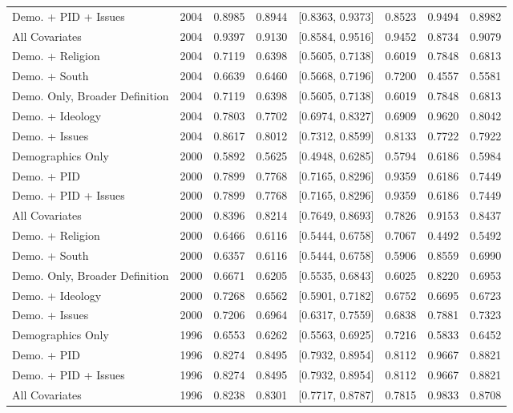 \begin{longtable}{lrrrlrrr}
  Demo. + PID + Issues & 2004 & 0.8985 & 0.8944 & [0.8363, 0.9373] & 0.8523 & 0.9494 & 0.8982 \\ 
  All Covariates & 2004 & 0.9397 & 0.9130 & [0.8584, 0.9516] & 0.9452 & 0.8734 & 0.9079 \\ 
  Demo. + Religion & 2004 & 0.7119 & 0.6398 & [0.5605, 0.7138] & 0.6019 & 0.7848 & 0.6813 \\ 
  Demo. + South & 2004 & 0.6639 & 0.6460 & [0.5668, 0.7196] & 0.7200 & 0.4557 & 0.5581 \\ 
  Demo. Only, Broader Definition & 2004 & 0.7119 & 0.6398 & [0.5605, 0.7138] & 0.6019 & 0.7848 & 0.6813 \\ 
  Demo. + Ideology & 2004 & 0.7803 & 0.7702 & [0.6974, 0.8327] & 0.6909 & 0.9620 & 0.8042 \\ 
  Demo. + Issues & 2004 & 0.8617 & 0.8012 & [0.7312, 0.8599] & 0.8133 & 0.7722 & 0.7922 \\ 
  Demographics Only & 2000 & 0.5892 & 0.5625 & [0.4948, 0.6285] & 0.5794 & 0.6186 & 0.5984 \\ 
  Demo. + PID & 2000 & 0.7899 & 0.7768 & [0.7165, 0.8296] & 0.9359 & 0.6186 & 0.7449 \\ 
  Demo. + PID + Issues & 2000 & 0.7899 & 0.7768 & [0.7165, 0.8296] & 0.9359 & 0.6186 & 0.7449 \\ 
  All Covariates & 2000 & 0.8396 & 0.8214 & [0.7649, 0.8693] & 0.7826 & 0.9153 & 0.8437 \\ 
  Demo. + Religion & 2000 & 0.6466 & 0.6116 & [0.5444, 0.6758] & 0.7067 & 0.4492 & 0.5492 \\ 
  Demo. + South & 2000 & 0.6357 & 0.6116 & [0.5444, 0.6758] & 0.5906 & 0.8559 & 0.6990 \\ 
  Demo. Only, Broader Definition & 2000 & 0.6671 & 0.6205 & [0.5535, 0.6843] & 0.6025 & 0.8220 & 0.6953 \\ 
  Demo. + Ideology & 2000 & 0.7268 & 0.6562 & [0.5901, 0.7182] & 0.6752 & 0.6695 & 0.6723 \\ 
  Demo. + Issues & 2000 & 0.7206 & 0.6964 & [0.6317, 0.7559] & 0.6838 & 0.7881 & 0.7323 \\ 
  Demographics Only & 1996 & 0.6553 & 0.6262 & [0.5563, 0.6925] & 0.7216 & 0.5833 & 0.6452 \\ 
  Demo. + PID & 1996 & 0.8274 & 0.8495 & [0.7932, 0.8954] & 0.8112 & 0.9667 & 0.8821 \\ 
  Demo. + PID + Issues & 1996 & 0.8274 & 0.8495 & [0.7932, 0.8954] & 0.8112 & 0.9667 & 0.8821 \\ 
  All Covariates & 1996 & 0.8238 & 0.8301 & [0.7717, 0.8787] & 0.7815 & 0.9833 & 0.8708 \\ 

\end{longtable}
